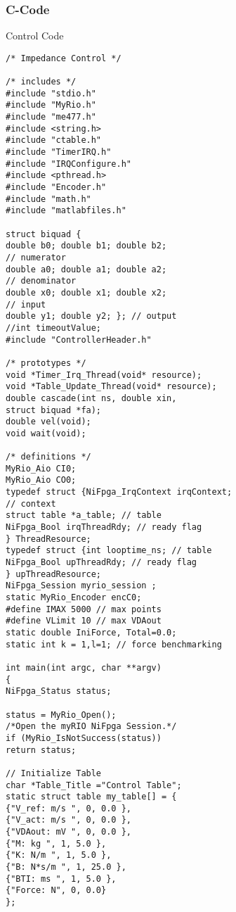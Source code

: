 \subsubsection*{C-Code}
\item{Control Code}
\begin{verbatim}
/* Impedance Control */

/* includes */
#include "stdio.h"
#include "MyRio.h"
#include "me477.h"
#include <string.h>
#include "ctable.h"
#include "TimerIRQ.h"
#include "IRQConfigure.h"
#include <pthread.h>
#include "Encoder.h"
#include "math.h"
#include "matlabfiles.h"

struct biquad {
double b0; double b1; double b2; 
// numerator
double a0; double a1; double a2; 
// denominator
double x0; double x1; double x2; 
// input
double y1; double y2; }; // output
//int timeoutValue;
#include "ControllerHeader.h"

/* prototypes */
void *Timer_Irq_Thread(void* resource);
void *Table_Update_Thread(void* resource);
double cascade(int ns, double xin, 
struct biquad *fa);
double vel(void);
void wait(void);

/* definitions */
MyRio_Aio CI0;
MyRio_Aio CO0;
typedef struct {NiFpga_IrqContext irqContext; 
// context
struct table *a_table; // table
NiFpga_Bool irqThreadRdy; // ready flag
} ThreadResource;
typedef struct {int looptime_ns; // table
NiFpga_Bool upThreadRdy; // ready flag
} upThreadResource;
NiFpga_Session myrio_session ;
static MyRio_Encoder encC0;
#define IMAX 5000 // max points
#define VLimit 10 // max VDAout
static double IniForce, Total=0.0;
static int k = 1,l=1; // force benchmarking

int main(int argc, char **argv)
{
NiFpga_Status status;

status = MyRio_Open();  	
/*Open the myRIO NiFpga Session.*/
if (MyRio_IsNotSuccess(status)) 
return status;

// Initialize Table
char *Table_Title ="Control Table";
static struct table my_table[] = {
{"V_ref: m/s ", 0, 0.0 },
{"V_act: m/s ", 0, 0.0 },
{"VDAout: mV ", 0, 0.0 },
{"M: kg ", 1, 5.0 },
{"K: N/m ", 1, 5.0 },
{"B: N*s/m ", 1, 25.0 },
{"BTI: ms ", 1, 5.0 },
{"Force: N", 0, 0.0}
};


\end{verbatim}
